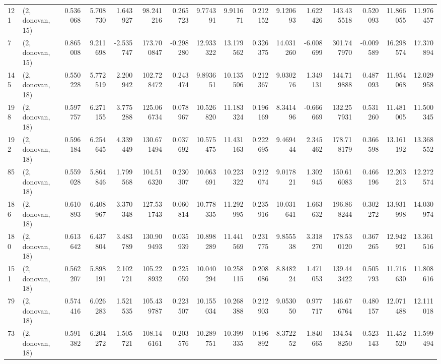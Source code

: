 \begin{tabular}{llrrrrrrrrrrrrrr}
121 &  (2, donovan, 15) &   0.536068 &   5.708730 &   1.643927 &    98.241216 &   0.265723 &   9.774391 &   9.911671 &  0.212152 &   9.120693 &   1.622426 &   143.435518 &  0.520093 &  11.866055 &  11.976457 \\
7   &  (2, donovan, 15) &   0.865008 &   9.211698 &  -2.535747 &   173.700847 &  -0.298280 &  12.933322 &  13.179562 &  0.326375 &  14.031260 &  -6.008699 &   301.747970 & -0.009589 &  16.298574 &  17.370894 \\
145 &  (2, donovan, 18) &   0.550228 &   5.772519 &   2.200942 &   102.728472 &   0.243474 &   9.893651 &  10.135506 &  0.212367 &   9.030276 &   1.349131 &   144.719888 &  0.487093 &  11.954068 &  12.029958 \\
198 &  (2, donovan, 18) &   0.597757 &   6.271155 &   3.775288 &   125.066734 &   0.078967 &  10.526820 &  11.183324 &  0.196169 &   8.341496 &  -0.666669 &   132.257931 &  0.531260 &  11.481005 &  11.500345 \\
192 &  (2, donovan, 18) &   0.596184 &   6.254645 &   4.339449 &   130.671494 &   0.037692 &  10.575475 &  11.431163 &  0.222695 &   9.469444 &   2.345462 &   178.718179 &  0.366598 &  13.161192 &  13.368552 \\
85  &  (2, donovan, 18) &   0.559028 &   5.864846 &   1.799568 &   104.516320 &   0.230307 &  10.063691 &  10.223322 &  0.212074 &   9.017821 &   1.302945 &   150.616083 &  0.466196 &  12.203213 &  12.272574 \\
186 &  (2, donovan, 18) &   0.610893 &   6.408967 &   3.370348 &   127.531743 &   0.060814 &  10.778335 &  11.292995 &  0.235916 &  10.031641 &   1.663632 &   196.868244 &  0.302272 &  13.931998 &  14.030974 \\
180 &  (2, donovan, 18) &   0.613642 &   6.437804 &   3.483789 &   130.909493 &   0.035939 &  10.898289 &  11.441569 &  0.231775 &   9.855538 &   3.318270 &   178.530120 &  0.367265 &  12.942921 &  13.361516 \\
151 &  (2, donovan, 18) &   0.562207 &   5.898191 &   2.102721 &   105.228932 &   0.225059 &  10.040294 &  10.258115 &  0.208086 &   8.848224 &   1.471053 &   139.443422 &  0.505793 &  11.716630 &  11.808616 \\
79  &  (2, donovan, 18) &   0.574416 &   6.026283 &   1.521535 &   105.439787 &   0.223507 &  10.155034 &  10.268388 &  0.212903 &   9.053050 &   0.977717 &   146.676764 &  0.480157 &  12.071488 &  12.111018 \\
73  &  (2, donovan, 18) &   0.591382 &   6.204272 &   1.505721 &   108.146161 &   0.203576 &  10.289751 &  10.399335 &  0.196892 &   8.372252 &   1.840665 &   134.548250 &  0.523143 &  11.452520 &  11.599494 \\

\end{tabular}
